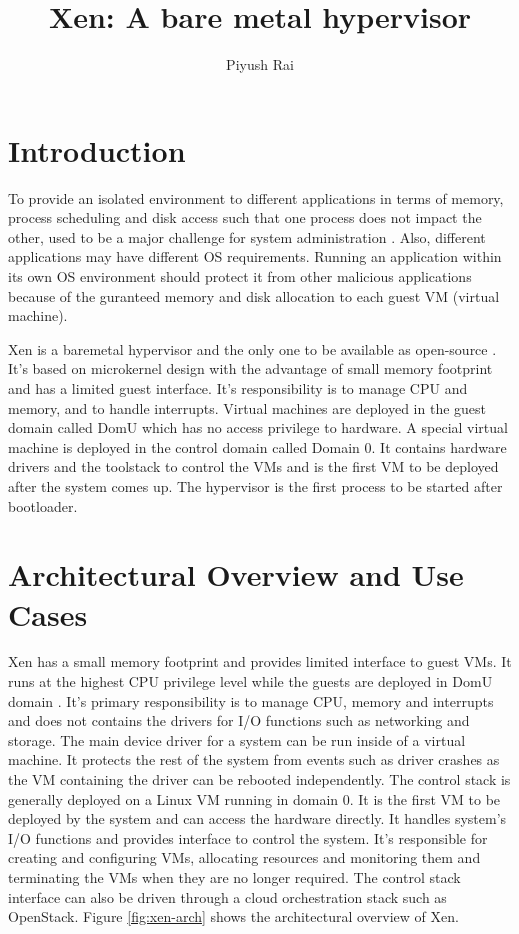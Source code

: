 \documentclass[9pt,twocolumn,twoside]{../../styles/osajnl}
\title{Xen: A bare metal hypervisor}
\author[1]{Piyush Rai}
\affil[1]{School of Informatics and Computing, Bloomington, IN 47408, U.S.A.}
\affil[*]{Corresponding authors: piyurai@iu.edu}
\affil[+]{HID - S17-IO-3014}
\begin{document}
\maketitle

\section{Introduction}

To provide an isolated environment to different applications in terms of memory, process scheduling and disk access such that one process does not impact the other, used to be a major challenge for system administration \cite{xenvirtualization}. Also, different applications may have different OS requirements. Running an application within its own OS environment should protect it from other malicious applications because of the guranteed memory and disk allocation to each guest VM (virtual machine).

Xen is a baremetal hypervisor and the only one to be available as open-source \cite{www-xen-wiki}. It's based on microkernel design with the advantage of small memory footprint and has a limited guest interface. It’s responsibility is to manage CPU and memory, and to handle interrupts. Virtual machines are deployed in the guest domain called DomU which has no access privilege to hardware. A special virtual machine is deployed in the control domain called Domain 0. It contains hardware drivers and the toolstack to control the VMs and is the first VM to be deployed after the system comes up. The hypervisor is the first process to be started after bootloader.

\section{Architectural Overview and Use Cases}

Xen has a small memory footprint and provides limited interface to guest VMs. It runs at the highest CPU privilege level while the guests are deployed in DomU domain \cite{www-xen-wiki}. It's primary responsibility is to manage CPU, memory and interrupts and does not contains the drivers for I/O functions such as networking and storage. The main device driver for a system can be run inside of a virtual machine. It protects the rest of the system from events such as driver crashes as the VM containing the driver can be rebooted independently. The control stack is generally deployed on a Linux VM running in domain 0. It is the first VM to be deployed by the system and can access the hardware directly. It handles system's I/O functions and provides interface to control the system. It's responsible for creating and configuring VMs, allocating resources and monitoring them and terminating the VMs when they are no longer required. The control stack interface can also be driven through a cloud orchestration stack such as OpenStack. Figure \ref{fig:xen-arch} shows the architectural overview of Xen.
\end{document}
